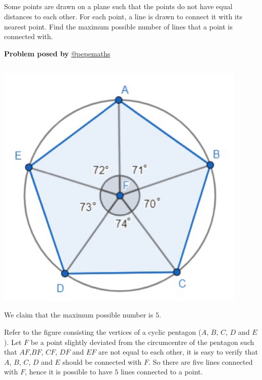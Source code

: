 \documentclass[12pt]{article}
\begin{document}
\subsection*{}
Some points are drawn on a plane such that the points do not have equal distances to each other. For each point, a line is drawn to connect it with its nearest point. Find the maximum possible number of  lines that a point is connected with.

\begin{flushright}
\textbf{Problem posed by}
\textcolor{RoyalBlue2}{\href{https://www.instagram.com/pepemaths/}{@pepemaths}}
\end{flushright}


\subsection*{}
\begin{center}
    \includegraphics[width = 12cm]{Figure1.4.png}
\end{center}
We claim that the maximum possible number is $5$.

Refer to the figure consisting the vertices of a cyclic pentagon ($A$, $B$, $C$, $D$ and $E$). Let $F$ be a point slightly deviated from the circumcentre of the pentagon such that $AF$,$BF$, $CF$, $DF$ and $EF$ are not equal to each other, it is easy to verify that $A$, $B$, $C$, $D$ and $E$ should be connected with $F$. So there are five lines connected with $F$, hence it is possible to have $5$ lines connected to a point.
\end{document}
